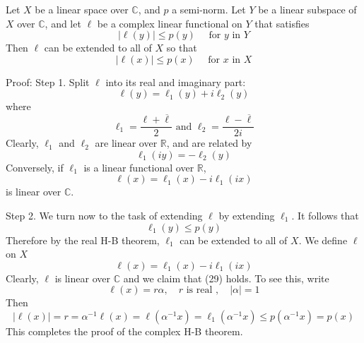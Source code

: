 \documentclass[12pt, oneside]{book}
\begin{document}
\begin{theorem}
    Let $X$ be a linear space over $\mathbb{C}$, and $p$ a semi-norm.
    Let $Y$ be a linear subspace of $X$ over $\mathbb{C}$, and let $\ell$ be a complex linear functional on $Y$ that satisfies
    \begin{equation*}
        |\ell(y)| \leq p(y) \quad \text { for } y \text { in } Y
    \end{equation*}
    Then $\ell$ can be extended to all of $X$ so that
    \begin{equation*}
        |\ell(x)| \leq p(x) \quad \text { for } x \text { in } X
    \end{equation*}

    Proof:
    Step 1.
    Split $\ell$ into its real and imaginary part:
    \begin{equation*}
        \ell(y)=\ell_1(y)+i \ell_2(y)
    \end{equation*}
    where
    \begin{equation*}
        \ell_1
        =
        \frac{\ell+\overline{\ell}}{2}
        \text{ and }
        \ell_2
        =
        \frac{\ell-\overline{\ell}}{2i}
    \end{equation*}
    Clearly, $\ell_1$ and $\ell_2$ are linear over $\mathbb{R}$, and are related by
    \begin{equation*}
        \ell_1(i y)=-\ell_2(y)
    \end{equation*}
    Conversely, if $\ell_1$ is a linear functional over $\mathbb{R}$,
    \begin{equation*}
        \ell(x)=\ell_1(x)-i \ell_1(i x)
    \end{equation*}
    is linear over $\mathbb{C}$.

    Step 2.
    We turn now to the task of extending $\ell$ by extending $\ell_1$. It follows that
    \begin{equation*}
        \ell_1(y) \leq p(y)
    \end{equation*}
    Therefore by the real H-B theorem, $\ell_1$ can be extended to all of $X$.  We define $\ell$ on $X$
    \begin{equation*}
        \ell(x)=\ell_1(x)-i \ell_1(i x)
    \end{equation*}
    Clearly, $\ell$ is linear over $\mathbb{C}$ and we claim that (29) holds. To see this, write
    \begin{equation*}
        \ell(x)= r \alpha, \quad r \text { is real }, \quad|\alpha|=1
    \end{equation*}
    Then
    \begin{equation*}
        |\ell(x)|=r=\alpha^{-1} \ell(x)=\ell\left(\alpha^{-1} x\right)=\ell_1\left(\alpha^{-1} x\right) \leq p\left(\alpha^{-1} x\right)=p(x)
    \end{equation*}
    This completes the proof of the complex H-B theorem.
\end{theorem}
\end{document}

